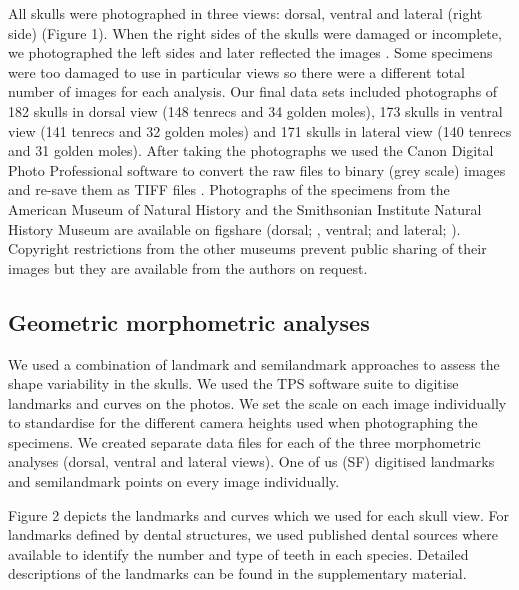 \documentclass[12pt,a4paper]{article}
\begin{document}
	All skulls were photographed in three views: dorsal, ventral and lateral (right side) (Figure 1). When the right sides of the skulls were damaged or incomplete, we photographed the left sides and later reflected the images \citep[e.g.][]{Barrow2008}. Some specimens were too damaged to use in particular views so there were a different total number of images for each analysis. Our final data sets included photographs of 182 skulls in dorsal view (148 tenrecs and 34 golden moles), 173 skulls in ventral view (141 tenrecs and 32 golden moles) and 171 skulls in lateral view (140 tenrecs and 31 golden moles). After taking the photographs we used the Canon Digital Photo Professional software \citep{DPP2013} to convert the raw files to binary (grey scale) images and re-save them as TIFF files \citep[uncompressed files preserve greater detail, ][]{RHOI2013}. Photographs of the specimens from the American Museum of Natural History and the Smithsonian Institute Natural History Museum are available on figshare (dorsal; \citet{Finlay2013d}, ventral; \citet{Finlay2013v} and lateral; \citet{Finlay2013l}). Copyright restrictions from the other museums prevent public sharing of their images but they are available from the authors on request.

\subsection{Geometric morphometric analyses}

	We used a combination of landmark and semilandmark approaches to assess the shape variability in the skulls.  We used the TPS software suite \citep{Rohlf2013} to digitise landmarks and curves on the photos. We set the scale on each image individually to standardise for the different camera heights used when photographing the specimens. We created separate data files for each of the three morphometric analyses (dorsal, ventral and lateral views). One of us (SF) digitised landmarks and semilandmark points on every image individually. 

	Figure 2 depicts the landmarks and curves which we used for each skull view. For landmarks defined by dental structures, we used published dental sources where available \citep{Repenning1967, Eisenberg1969, Nowak1983, MacPhee1987, KnoxJones1992, Davis1997, Querouil2001, Nagorsen2002, Wilson2005, Goodman2006, Karatas2007, Hoffmann2008, Asher2008,  Muldoon2009, Lin2010}  to identify the number and type of teeth in each species. Detailed descriptions of the landmarks can be found in the supplementary material.
\end{document}
